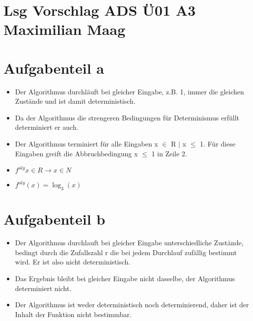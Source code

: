 \documentclass{article}
\begin{document}
	\section*{Lsg Vorschlag ADS Ü01 A3 Maximilian Maag}
	\section*{Aufgabenteil a}
	\begin{itemize}
		\item Der Algorithmus durchläuft bei gleicher Eingabe, z.B. 1, immer die gleichen Zustände und ist damit deterministisch.
		\item Da der Algorithmus die strengeren Bedingungen für Determinismus erfüllt determiniert er auch.
		\item Der Algorithmus terminiert für alle Eingaben x $\in$ R $|$ x $\leq$ 1.
		Für diese Eingaben greift die Abbruchbedingung x $\leq$ 1 in Zeile 2.
		\item $f^{alg} x \in R \to x \in N$ 
		\item$f^{alg}(x) = \log_{3}(x)$
	\end{itemize}
	\section*{Aufgabenteil b}
	\begin{itemize}
		\item Der Algorithmus durchlauft bei gleicher Eingabe unterschiedliche Zustände, bedingt durch die Zufallszahl r die bei jedem Durchlauf zufällig bestimmt wird. Er ist also nicht deterministisch.
		\item Das Ergebnis bleibt bei gleicher Eingabe nicht dasselbe, der Algorithmus determiniert nicht.
		\item Der Algorithmus ist weder deterministisch noch determinierend, daher ist der Inhalt der Funktion nicht bestimmbar.
		
	\end{itemize}
	
\end{document}
